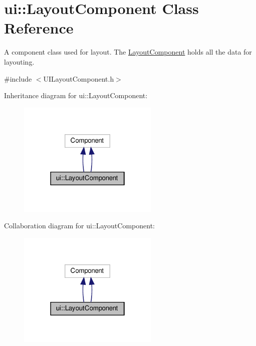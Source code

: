 \hypertarget{classui_1_1LayoutComponent}{}\section{ui\+:\+:Layout\+Component Class Reference}
\label{classui_1_1LayoutComponent}


A component class used for layout. The \hyperlink{classui_1_1LayoutComponent}{Layout\+Component} holds all the data for layouting.  




{\ttfamily \#include $<$U\+I\+Layout\+Component.\+h$>$}



Inheritance diagram for ui\+:\+:Layout\+Component\+:
\nopagebreak
\begin{figure}[H]
\begin{center}
\leavevmode
\includegraphics[width=190pt]{classui_1_1LayoutComponent__inherit__graph}
\end{center}
\end{figure}


Collaboration diagram for ui\+:\+:Layout\+Component\+:
\nopagebreak
\begin{figure}[H]
\begin{center}
\leavevmode
\includegraphics[width=190pt]{classui_1_1LayoutComponent__coll__graph}
\end{center}
\end{figure}
